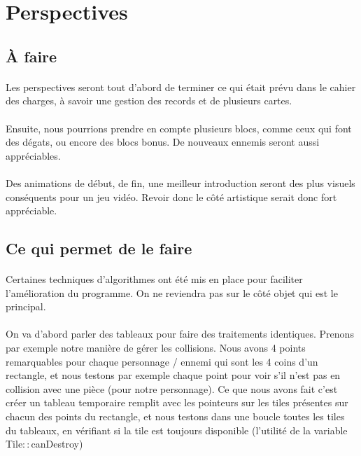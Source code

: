 ﻿\section{Perspectives}

\subsection{À faire}

\paragraph{} Les perspectives seront tout d'abord de terminer ce qui était prévu dans le cahier des charges, à savoir une gestion des records et de plusieurs cartes.
\paragraph{} Ensuite, nous pourrions prendre en compte plusieurs blocs, comme ceux qui font des dégats, ou encore des blocs bonus. De nouveaux ennemis seront aussi appréciables.
\paragraph{} Des animations de début, de fin, une meilleur introduction seront des plus visuels conséquents pour un jeu vidéo. Revoir donc le côté artistique serait donc fort appréciable.

\subsection{Ce qui permet de le faire}

\paragraph{} Certaines techniques d'algorithmes ont été mis en place pour faciliter l'amélioration du programme. On ne reviendra pas sur le côté objet qui est le principal.
\paragraph{} On va d'abord parler des tableaux pour faire des traitements identiques. Prenons par exemple notre manière de gérer les collisions. Nous avons 4 points remarquables pour chaque personnage / ennemi qui sont les 4 coins d'un rectangle, et nous testons par exemple chaque point pour voir s'il n'est pas en collision avec une pièce (pour notre personnage). Ce que nous avons fait c'est créer un tableau temporaire remplit avec les pointeurs sur les tiles présentes sur chacun des points du rectangle, et nous testons dans une boucle toutes les tiles du tableaux, en vérifiant si la tile est toujours disponible (l'utilité de la variable Tile$::$canDestroy)
